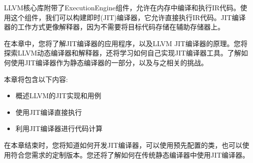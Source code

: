 LLVM核心库附带了ExecutionEngine组件，允许在内存中编译和执行IR代码。使用这个组件，我们可以构建即时(JIT)编译器，它允许直接执行IR代码。JIT编译器的工作方式更像解释器，因为不需要将目标代码存储在辅助存储器上。\par

在本章中，您将了解JIT编译器的应用程序，以及LLVM JIT编译器的原理。您将探索LLVM动态编译器和解释器，还将学习如何自己实现JIT编译器工具。了解如何使用JIT编译器作为静态编译器的一部分，以及与之相关的挑战。\par

本章将包含以下内容:\par

\begin{itemize}
\item 概述LLVM的JIT实现和用例
\item 使用JIT编译直接执行
\item 利用JIT编译器进行代码计算
\end{itemize}

在本章结束时，您将知道如何开发JIT编译器，可以使用预先配置的类，也可以使用符合您需求的定制版本。您还将了解如何在传统静态编译器中使用JIT编译器。\par










